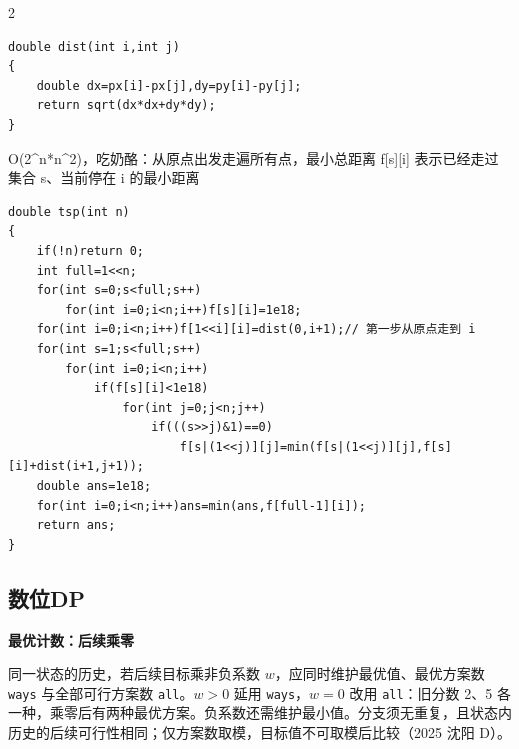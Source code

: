 \documentclass[UTF8,fontset=fandol,a4paper,twoside]{ctexart}
\newcommand{\topic}[1]{\par\smallskip\textbf{#1}\par\nobreak}
\newcommand{\note}[1]{{\fontsize{10}{12}\selectfont #1\par}}
\begin{document}
\begin{multicols}{2}
\begin{lstlisting}
double dist(int i,int j)
{
    double dx=px[i]-px[j],dy=py[i]-py[j];
    return sqrt(dx*dx+dy*dy);
}
\end{lstlisting}
\note{O(\allowbreak{}2\textasciicircum{}n*n\textasciicircum{}2)\allowbreak{}，吃奶酪：从原点出发走遍所有点，最小总距离 f[\allowbreak{}s]\allowbreak{}[\allowbreak{}i]\allowbreak{} 表示已经走过集合 s、当前停在 i 的最小距离}
\begin{lstlisting}
double tsp(int n)
{
    if(!n)return 0;
    int full=1<<n;
    for(int s=0;s<full;s++)
        for(int i=0;i<n;i++)f[s][i]=1e18;
    for(int i=0;i<n;i++)f[1<<i][i]=dist(0,i+1);// 第一步从原点走到 i
    for(int s=1;s<full;s++)
        for(int i=0;i<n;i++)
            if(f[s][i]<1e18)
                for(int j=0;j<n;j++)
                    if(((s>>j)&1)==0)
                        f[s|(1<<j)][j]=min(f[s|(1<<j)][j],f[s][i]+dist(i+1,j+1));
    double ans=1e18;
    for(int i=0;i<n;i++)ans=min(ans,f[full-1][i]);
    return ans;
}
\end{lstlisting}
\subsection{数位DP}

\topic{最优计数：后续乘零}
\note{同一状态的历史，若后续目标乘非负系数 $w$，应同时维护最优值、最优方案数 \texttt{ways} 与全部可行方案数 \texttt{all}。$w>0$ 延用 \texttt{ways}，$w=0$ 改用 \texttt{all}：旧分数 2、5 各一种，乘零后有两种最优方案。负系数还需维护最小值。分支须无重复，且状态内历史的后续可行性相同；仅方案数取模，目标值不可取模后比较（2025 沈阳 D）。}


\end{multicols}
\end{document}
